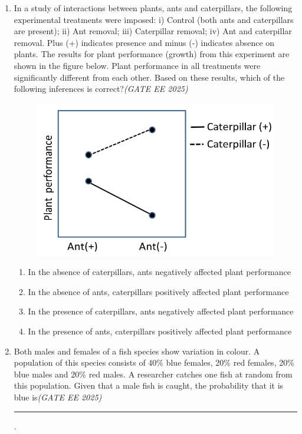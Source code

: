 \begin{enumerate}[leftmargin=*,label=\textbf{Q.\arabic*},resume]
\item In a study of interactions between plants, ants and caterpillars, the following experimental treatments were imposed: i) Control (both ants and caterpillars are present); ii) Ant removal; iii) Caterpillar removal; iv) Ant and caterpillar removal. Plus (+) indicates presence and minus (-) indicates absence on plants. The results for plant performance (growth) from this experiment are shown in the figure below. Plant performance in all treatments were significantly different from each other. Based on these results, which of the following inferences is correct?\hfill \textit{(GATE EE 2025)}
\vspace{1em}
\begin{figure}[h!]
    \centering
    \includegraphics[width=0.9\linewidth]{figs/imageQ48.png}
\end{figure}
\vspace{1em}
\begin{multicols}{2}
\begin{enumerate}[label=(\Alph*)]
\item In the absence of caterpillars, ants negatively affected plant performance
\item In the absence of ants, caterpillars positively affected plant performance
\item In the presence of caterpillars, ants negatively affected plant performance
\item In the presence of ants, caterpillars positively affected plant performance
\end{enumerate}
\end{multicols}

\item Both males and females of a fish species show variation in colour. A population of this species consists of 40\% blue females, 20\% red females, 20\% blue males and 20\% red males. A researcher catches one fish at random from this population. Given that a male fish is caught, the probability that it is blue is\hfill \textit{(GATE EE 2025)} \rule{4cm}{0.15mm}.


\end{enumerate}
